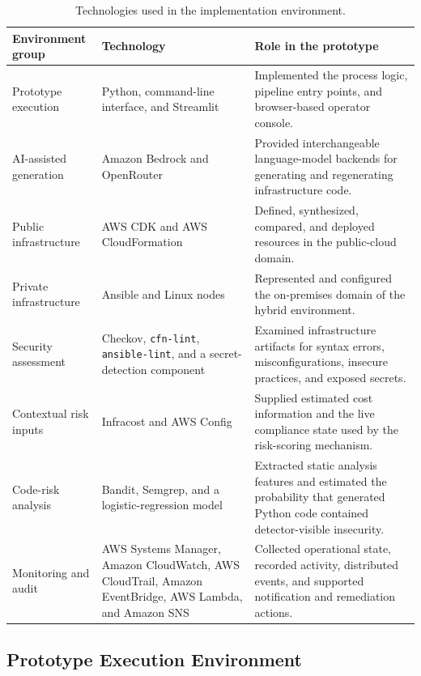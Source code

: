\begin{table}[htb!]
\centering
\small
\setlength{\tabcolsep}{4pt}
\caption{Technologies used in the implementation environment.}
\label{tab:implementation-environment}
\begin{tabular}{|L{3.6cm}|L{4.2cm}|L{6.0cm}|}
\hline
\textbf{Environment group} & \textbf{Technology} & \textbf{Role in the prototype} \\
\hline
Prototype execution & Python, command-line interface, and Streamlit & Implemented the
process logic, pipeline entry points, and browser-based operator console. \\
\hline
AI-assisted generation & Amazon Bedrock and OpenRouter & Provided interchangeable
language-model backends for generating and regenerating infrastructure code. \\
\hline
Public infrastructure & AWS CDK and AWS CloudFormation & Defined, synthesized, compared,
and deployed resources in the public-cloud domain. \\
\hline
Private infrastructure & Ansible and Linux nodes & Represented and configured the
on-premises domain of the hybrid environment. \\
\hline
Security assessment & Checkov, \texttt{cfn-lint}, \texttt{ansible-lint}, and a
secret-detection component & Examined infrastructure artifacts for syntax errors,
misconfigurations, insecure practices, and exposed secrets. \\
\hline
Contextual risk inputs & Infracost and AWS Config & Supplied estimated cost information
and the live compliance state used by the risk-scoring mechanism. \\
\hline
Code-risk analysis & Bandit, Semgrep, and a logistic-regression model & Extracted static
analysis features and estimated the probability that generated Python code contained
detector-visible insecurity. \\
\hline
Monitoring and audit & AWS Systems Manager, Amazon CloudWatch, AWS CloudTrail, Amazon
EventBridge, AWS Lambda, and Amazon SNS & Collected operational state, recorded activity,
distributed events, and supported notification and remediation actions. \\
\hline
\end{tabular}
\end{table}

\subsection{Prototype Execution Environment}
\label{subsec:prototype-execution-environment}

